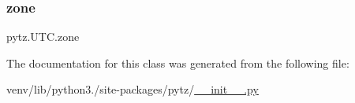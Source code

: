 \subsubsection{\texorpdfstring{zone}{zone}}
{\footnotesize\ttfamily pytz.\+U\+T\+C.\+zone\hspace{0.3cm}{\ttfamily [static]}}



The documentation for this class was generated from the following file\+:\begin{DoxyCompactItemize}
\item 
venv/lib/python3./site-\/packages/pytz/\hyperlink{venv_2lib_2python3_89_2site-packages_2pytz_2____init_____8py}{\+\_\+\+\_\+init\+\_\+\+\_\+.\+py}\end{DoxyCompactItemize}
